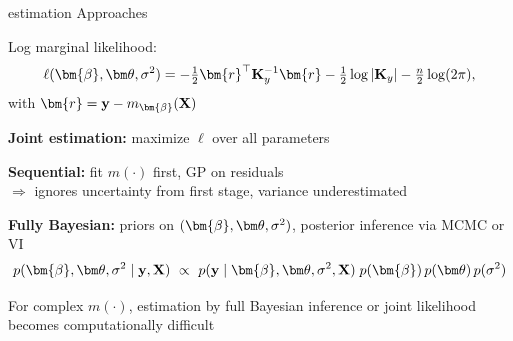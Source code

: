 \documentclass[11pt,compress,t,notes=noshow, xcolor=table]{beamer}
\begin{document}



\begin{framei}[sep=L]{estimation Approaches }
\item Log marginal likelihood:
$$\ell(\bm{\beta},\thetav,\sigma^2) = -\tfrac{1}{2}\bm{r}^\top \Ky^{-1}\bm{r}
-\tfrac{1}{2}\log|\Ky| - \tfrac{n}{2}\log(2\pi),$$
with $\bm{r}=\yv - m_{\bm{\beta}}(\Xmat)$
\item \textbf{Joint estimation:} maximize $\ell$ over all parameters 
\item \textbf{Sequential:} fit $m(\cdot)$ first, GP on residuals \\
\hspace*{1em}$\Rightarrow$ ignores uncertainty from first stage, variance underestimated
\item \textbf{Fully Bayesian:} priors on $(\bm{\beta},\thetav,\sigma^2)$, posterior inference via MCMC or VI
$$p(\bm{\beta},\thetav,\sigma^2 \mid \yv,\Xmat)\ \propto\ 
p(\yv \mid \bm{\beta},\thetav,\sigma^2,\Xmat)\;
p(\bm{\beta})\,p(\thetav)\,p(\sigma^2)$$
\item For complex $m(\cdot)$, estimation by full Bayesian inference or joint likelihood becomes computationally difficult
\end{framei}

\end{document}
